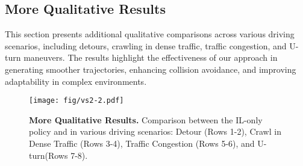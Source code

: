 \subsection{More Qualitative Results}
This section presents additional qualitative comparisons across various driving scenarios, including detours, crawling in dense traffic, traffic congestion, and U-turn maneuvers. The results highlight the effectiveness of our approach in generating smoother trajectories, enhancing collision avoidance, and improving adaptability in complex environments.

\begin{figure*}[h]
\centering
\vspace{1mm}
\texttt{[image: fig/vs2-2.pdf]} 
\vspace{2mm}
\caption{
\textbf{More Qualitative Results.} Comparison between the IL-only policy and \thename{} in various driving scenarios: Detour (Rows 1-2), Crawl in Dense Traffic (Rows 3-4), Traffic Congestion (Rows 5-6), and U-turn(Rows 7-8).
}
\label{fig:more-vis}
\end{figure*}